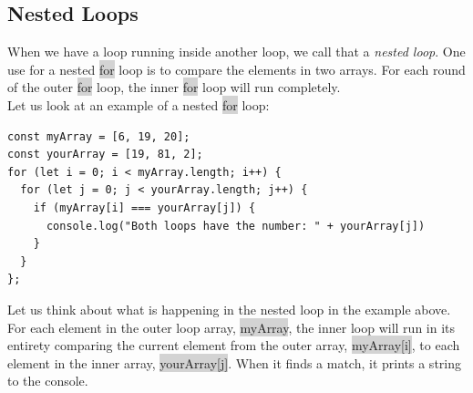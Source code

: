 \documentclass[11pt]{article}
\begin{document}
\subsection{Nested Loops}
When we have a loop running inside another loop, we call that a \textit{nested loop}. One use for a nested \colorbox{lightgray}{for} loop is to compare the elements in two arrays. For each round of the outer \colorbox{lightgray}{for} loop, the inner \colorbox{lightgray}{for} loop will run completely. \\
\newline
Let us look at an example of a nested \colorbox{lightgray}{for} loop:
\begin{lstlisting}
const myArray = [6, 19, 20];
const yourArray = [19, 81, 2];
for (let i = 0; i < myArray.length; i++) {
  for (let j = 0; j < yourArray.length; j++) {
    if (myArray[i] === yourArray[j]) {
      console.log("Both loops have the number: " + yourArray[j])
    }
  }
};
\end{lstlisting}
Let us think about what is happening in the nested loop in the example above. For each element in the outer loop array, \colorbox{lightgray}{myArray}, the inner loop will run in its entirety comparing the current element from the outer array, \colorbox{lightgray}{myArray[i]}, to each element in the inner array, \colorbox{lightgray}{yourArray[j]}. When it finds a match, it prints a string to the console.
\end{document}
